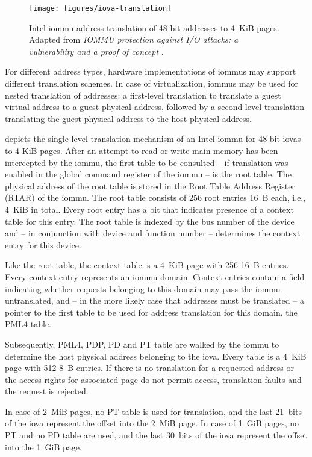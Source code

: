 \begin{figure}[!b]
    \centering
    \texttt{[image: figures/iova-translation]}
    \caption{Intel \acs{iommu} address translation of 48-bit addresses to 4~KiB
    pages. Adapted from \textit{IOMMU protection against I/O attacks: a
    vulnerability and a proof of concept} \cite{morgan2018iommu}.}
    \label{fig:translation}
\end{figure}

For different address types, hardware implementations of \acp{iommu} may support
different translation schemes. In case of virtualization, \acp{iommu} may be
used for nested translation of addresses: a first-level translation to translate
a guest virtual address to a guest physical address, followed by a second-level
translation translating the guest physical address to the host physical address.

 depicts the single-level translation mechanism of an
Intel \ac{iommu} for 48-bit \acp{iova} to 4 KiB pages. After an attempt to read
or write main memory has been intercepted by the \ac{iommu}, the first table to
be consulted -- if translation was enabled in the global command register of the
\ac{iommu} -- is the root table. The physical address of the root table is
stored in the Root Table Address Register (RTAR) of the \ac{iommu}. The root
table consists of 256 root entries 16~B each, i.e., 4~KiB in total. Every root
entry has a bit that indicates presence of a context table for this entry. The
root table is indexed by the bus number of the device and -- in conjunction with
device and function number -- determines the context entry for this device.

Like the root table, the context table is a 4~KiB page with 256 16~B entries.
Every context entry represents an \ac{iommu} domain. Context entries contain a
field indicating whether requests belonging to this domain may pass the
\ac{iommu} untranslated, and -- in the more likely case that addresses must be
translated -- a pointer to the first table to be used for address translation
for this domain, the PML4 table.

Subsequently, PML4, PDP, PD and PT table are walked by the \ac{iommu} to
determine the host physical address belonging to the \ac{iova}. Every
table is a 4~KiB page with 512 8~B entries. If there is no translation for a
requested address or the access rights for associated page do not permit access,
translation faults and the request is rejected.

In case of 2~MiB pages, no PT table is used for translation, and the last
21~bits of the \ac{iova} represent the offset into the 2~MiB page. In case of
1~GiB pages, no PT and no PD table are used, and the last 30~bits of the
\ac{iova} represent the offset into the 1~GiB page.

